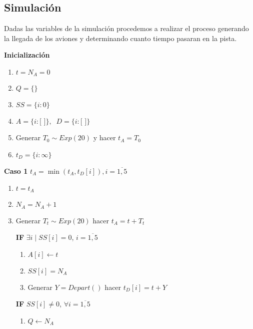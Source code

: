 \documentclass[a4paper,10pt,twocolumn]{article}
\begin{document}
	\subsection{Simulaci\'on}\label{sub:figures}
		
		Dadas las variables de la simulaci\'on procedemos a realizar el proceso generando la llegada de los aviones y determinando cuanto tiempo pasaran en la pista.
		
		\newpage
		
		\textbf{Inicializaci\'on}
		\begin{enumerate}
			\item[] $t = N_{A} = 0$
			\item[] $Q = \{\}$
			\item[] $SS = \{i: 0\}$
			\item[] $A = \{i: \text{[ ]}\}, \;\; D = \{i: \text{[ ]}\}$
			\item[] Generar $T_{0} \sim Exp(20)$ y hacer $t_{A} = T_{0}$
			\item[] $t_{D} = \{i: \infty\}$
		\end{enumerate}

		\textbf{Caso 1} $ t_{A} = \min{( t_{A}, t_{D}[i] )}, i = \overline{1,5}$
		
		\begin{enumerate}
			\item[] $t = t_{A}$
			\item[] $N_{A} = N_{A} + 1$
			\item[] Generar $T_{t} \sim Exp(20)$ hacer $t_{A} = t + T_{t}$
			
			\textbf{IF} $\exists i \; | \; SS[i] = 0$, $i = \overline{1,5}$
				\begin{enumerate}
					\item[] $A[i] \leftarrow t$
					\item[] $SS[i] = N_{A}$
					\item[] Generar $Y = Depart()$ hacer $t_{D}[i] = t + Y$ 
				\end{enumerate}
			
			\textbf{IF} $SS[i] \neq 0$, $\forall i = \overline{1,5}$
			\begin{enumerate}
				\item[] $Q \leftarrow N_{A}$ 
			\end{enumerate}
		\end{enumerate}
	
\end{document}

